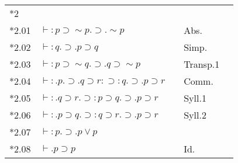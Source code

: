 \begin{tabular}[t]{l@{\quad}l@{\quad}l@{\quad}ll}
\\
{*2}\\
{*2.01} & $\vdash:p\supset\sim{p}.\supset.\sim{p}$ && Abs.\\
{*2.02} & $\vdash:q.\supset.p\supset{q}$ && Simp.\\
{*2.03} & $\vdash:p\supset\sim{q}.\supset.q\supset\sim{p}$ && Transp.1\\
{*2.04} & $\vdash:.p.\supset.q\supset{r}:\supset:q.\supset.p\supset{r}$ && Comm.\\
{*2.05} & $\vdash:.q\supset{r}.\supset:p\supset{q}.\supset.p\supset{r}$ && Syll.1\\
{*2.06} & $\vdash:.p\supset{q}.\supset:q\supset{r}.\supset.p\supset{r}$ && Syll.2\\
{*2.07} & $\vdash:p.\supset.p\vee{p}$\\
{*2.08} & $\vdash.p\supset{p}$ && Id.\\
\end{tabular}